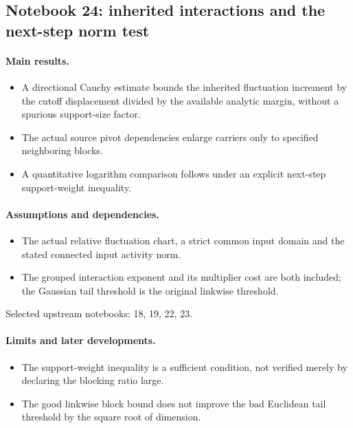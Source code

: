 \documentclass[11pt]{article}
\theoremstyle{remark}
\begin{document}
\subsection{Notebook 24: inherited interactions and the next-step norm test}
\label{hnc-24}
\noindent{}\par

\paragraph{Main results.}
\begin{itemize}
\item A directional Cauchy estimate bounds the inherited fluctuation increment by the cutoff displacement divided by the available analytic margin, without a spurious support-size factor.
\item The actual source pivot dependencies enlarge carriers only to specified neighboring blocks.
\item A quantitative logarithm comparison follows under an explicit next-step support-weight inequality.
\end{itemize}

\paragraph{Assumptions and dependencies.}
\begin{itemize}
\item The actual relative fluctuation chart, a strict common input domain and the stated connected input activity norm.
\item The grouped interaction exponent and its multiplier cost are both included; the Gaussian tail threshold is the original linkwise threshold.
\end{itemize}

Selected upstream notebooks: 18, 19, 22, 23.\par

\paragraph{Limits and later developments.}
\begin{itemize}
\item The support-weight inequality is a sufficient condition, not verified merely by declaring the blocking ratio large.
\item The good linkwise block bound does not improve the bad Euclidean tail threshold by the square root of dimension.
\end{itemize}
\end{document}
